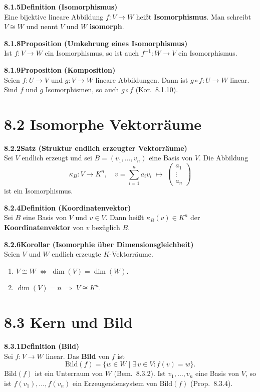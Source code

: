 \documentclass[a4paper,12pt]{article}
\newcommand{\gentry}[3]{%
  \noindent\textbf{#1\quad #2}\nopagebreak\\[0.2em]
  #3\par\smallskip
}
\begin{document}
\gentry{8.1.5}{Definition (Isomorphismus)}{%
  Eine bijektive lineare Abbildung $f: V \to W$ heißt \textbf{Isomorphismus}.
  Man schreibt $V \cong W$ und nennt $V$ und $W$ \textbf{isomorph}.
}

\gentry{8.1.8}{Proposition (Umkehrung eines Isomorphismus)}{%
  Ist $f: V \to W$ ein Isomorphismus, so ist auch $f^{-1}: W \to V$ ein
  Isomorphismus.
}

\gentry{8.1.9}{Proposition (Komposition)}{%
  Seien $f: U \to V$ und $g: V \to W$ lineare Abbildungen. Dann ist
  $g \circ f: U \to W$ linear. Sind $f$ und $g$ Isomorphismen, so auch
  $g \circ f$ (Kor.~8.1.10).
}

\section*{8.2 \quad Isomorphe Vektorräume}

\gentry{8.2.2}{Satz (Struktur endlich erzeugter Vektorräume)}{%
  Sei $V$ endlich erzeugt und sei $B = (v_1,\ldots,v_n)$ eine Basis von $V$.
  Die Abbildung
  \[
    \kappa_B: V \to K^n, \quad v = \textstyle\sum_{i=1}^n a_i v_i
    \;\mapsto\; \begin{pmatrix}a_1\\\vdots\\a_n\end{pmatrix}
  \]
  ist ein Isomorphismus.
}

\gentry{8.2.4}{Definition (Koordinatenvektor)}{%
  Sei $B$ eine Basis von $V$ und $v \in V$. Dann heißt $\kappa_B(v) \in K^n$
  der \textbf{Koordinatenvektor} von $v$ bezüglich $B$.
}

\gentry{8.2.6}{Korollar (Isomorphie über Dimensionsgleichheit)}{%
  Seien $V$ und $W$ endlich erzeugte $K$-Vektorräume.
  \begin{enumerate}[label=(\alph*),topsep=2pt,itemsep=1pt]
    \item $V \cong W \;\Leftrightarrow\; \dim(V) = \dim(W)$.
    \item $\dim(V) = n \;\Rightarrow\; V \cong K^n$.
  \end{enumerate}
}

\section*{8.3 \quad Kern und Bild}

\gentry{8.3.1}{Definition (Bild)}{%
  Sei $f: V \to W$ linear. Das \textbf{Bild} von $f$ ist
  \[
    \mathrm{Bild}(f) = \{w \in W \mid \exists\, v \in V: f(v) = w\}.
  \]
  $\mathrm{Bild}(f)$ ist ein Unterraum von $W$ (Bem.~8.3.2).
  Ist $v_1,\ldots,v_n$ eine Basis von $V$, so ist $f(v_1),\ldots,f(v_n)$
  ein Erzeugendensystem von $\mathrm{Bild}(f)$ (Prop.~8.3.4).
}
\end{document}
